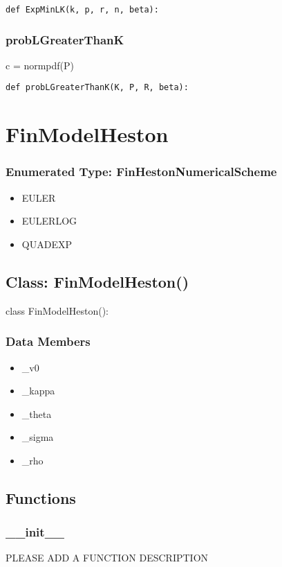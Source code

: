 \documentclass[twoside,11pt]{book}
\begin{document}
\begin{lstlisting}
def ExpMinLK(k, p, r, n, beta):
\end{lstlisting}

\subsubsection*{{\bf probLGreaterThanK}}
c = normpdf(P) 

\begin{lstlisting}
def probLGreaterThanK(K, P, R, beta):
\end{lstlisting}

\newpage
\section{FinModelHeston}

\subsubsection{Enumerated Type: FinHestonNumericalScheme}
\begin{itemize}
\item{EULER}
\item{EULERLOG}
\item{QUADEXP}
\end{itemize}

\subsection*{Class: FinModelHeston()}
class FinModelHeston(): 

\subsubsection*{Data Members}
\begin{itemize}
\item{\_v0}
\item{\_kappa}
\item{\_theta}
\item{\_sigma}
\item{\_rho}
\end{itemize}

\subsection*{Functions}

\subsubsection*{{\bf \_\_init\_\_}}
PLEASE ADD A FUNCTION DESCRIPTION
\end{document}
